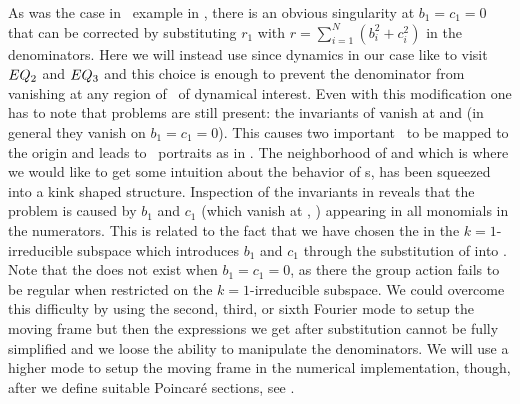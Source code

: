 As was the case in \CLe\ example in ,
there is an obvious singularity at $b_1=c_1=0$ that can be corrected by substituting
$r_1$ with
$r=\sum_{i=1}^N (b_i^2+c_i^2)$ in the denominators.
Here we will instead use 
since
dynamics in our case like to visit $EQ_{2}$ and $EQ_{3}$
and this choice is enough to prevent the denominator from
vanishing at any region of \statesp\ of dynamical interest.
Even with this modification one has to note that problems
are still present: the invariants of
 vanish at  and  (in general
they vanish on $b_1=c_1=0$).
This causes two important
\eqva\ to be mapped to the origin and leads to \statesp\
portraits as in . The neighborhood of
 and  which is where we would like to get some
intuition about the behavior of \rpo s, has been squeezed into
a kink shaped structure.
Inspection of the invariants in  reveals
that the problem is caused by $b_1$ and $c_1$ (which vanish
at , ) appearing in all monomials in the
numerators. This is related to the fact that we have chosen
the {\csection} in the $k=1$-irreducible subspace which
introduces $b_1$ and $c_1$ through the substitution of
 into . Note that the
{\csection} does not exist when $b_1=c_1=0$, as there the
group action fails to be regular when restricted on the
$k=1$-irreducible subspace.
We could overcome this
difficulty by using the second, third, or sixth Fourier mode
to setup the moving frame but then the expressions we get
after substitution cannot be fully simplified and we loose
the ability to manipulate the denominators. We will use a
higher mode to setup the moving frame in the numerical
implementation, though, after we define suitable Poincar\'e
sections, see .

